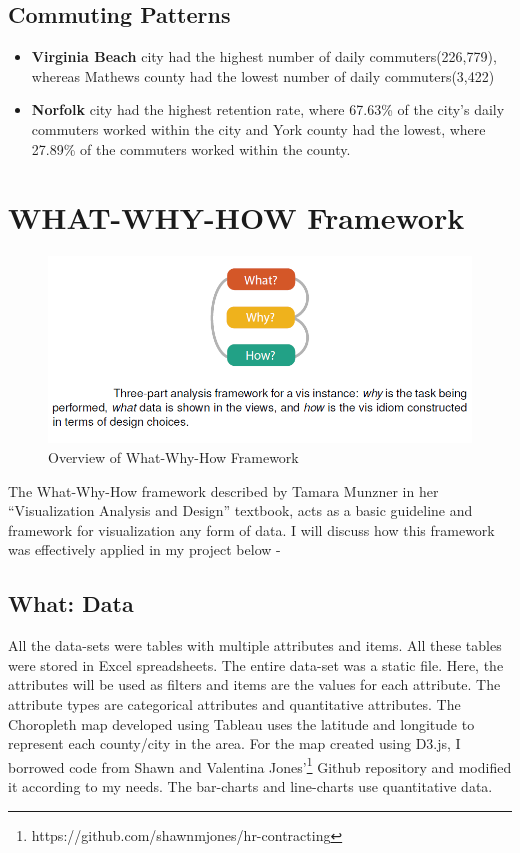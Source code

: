 \documentclass[12pt]{article}
\begin{document}
\subsection{Commuting Patterns}
\begin{itemize}

\item \textbf{Virginia Beach} city had the highest number of daily commuters(226,779), whereas Mathews county had the lowest
number of daily commuters(3,422)
\item \textbf{Norfolk} city had the highest retention rate, where 67.63\% of the city's daily commuters worked within the city and York county had the lowest, where 27.89\% of the commuters worked within the county.

\end{itemize}

\newpage

\section{WHAT-WHY-HOW Framework}

\begin{figure}[htp]
\centering
\includegraphics[scale = 0.5]{WWH.PNG}
\caption{Overview of What-Why-How Framework}
\label{highq}
\end{figure}

The What-Why-How framework described by Tamara Munzner in her ``Visualization Analysis and Design'' textbook, acts as a basic guideline and framework for visualization any form of data. I will discuss how this framework was effectively applied in
my project below - 

\subsection{What: Data}

All the data-sets were tables with multiple attributes and items. All these tables were stored in Excel spreadsheets. The entire data-set was a static file. Here, the attributes will be used as filters and items are the values for each attribute. The attribute types are categorical attributes and quantitative attributes. The Choropleth map developed using Tableau uses the latitude and longitude to represent each county/city in the area. For the map created using D3.js, I borrowed code from Shawn and Valentina Jones'\footnote[7]{https://github.com/shawnmjones/hr-contracting} Github repository and modified it according to my needs. The bar-charts and line-charts use quantitative data.
\end{document}
